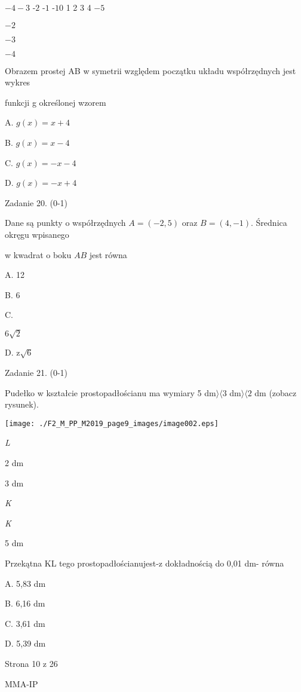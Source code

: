 \documentclass[a4paper,12pt]{article}
\begin{document}
$-4  -3$ -$2$ -$1$ -$10$  1 2 3 4  $-5$

$-2$

$-3$

$-4$

Obrazem prostej AB w symetrii względem początku układu współrzędnych jest wykres

funkcji g określonej wzorem

A. $g(x)=x+4$

B. $g(x)=x-4$

C. $g(x)=-x-4$

D. $g(x)=-x+4$

Zadanie 20. (0-1)

Dane są punkty o współrzędnych $A=(-2,5)$ oraz $B=(4,-1)$. Średnica okręgu wpisanego

w kwadrat o boku $AB$ jest równa

A. 12

B. 6

C.

$6\sqrt{2}$

D. $\mathrm{z}\sqrt{6}$

Zadanie 21. (0-1)

Pudełko w kształcie prostopadłościanu ma wymiary 5 dm$\rangle\langle 3$ dm$\rangle\langle 2$ dm (zobacz rysunek).
\begin{center}
\texttt{[image: ./F2\_M\_PP\_M2019\_page9\_images/image002.eps]}
\end{center}
{\it L}

2 dm

3 dm

{\it K}

{\it K}

5 dm

Przekątna KL tego prostopadłościanujest-z dokładnością do 0,01 dm- równa

A. 5,83 dm

B. 6,16 dm

C. 3,61 dm

D. 5,39 dm

Strona 10 z 26

MMA-IP
\end{document}
